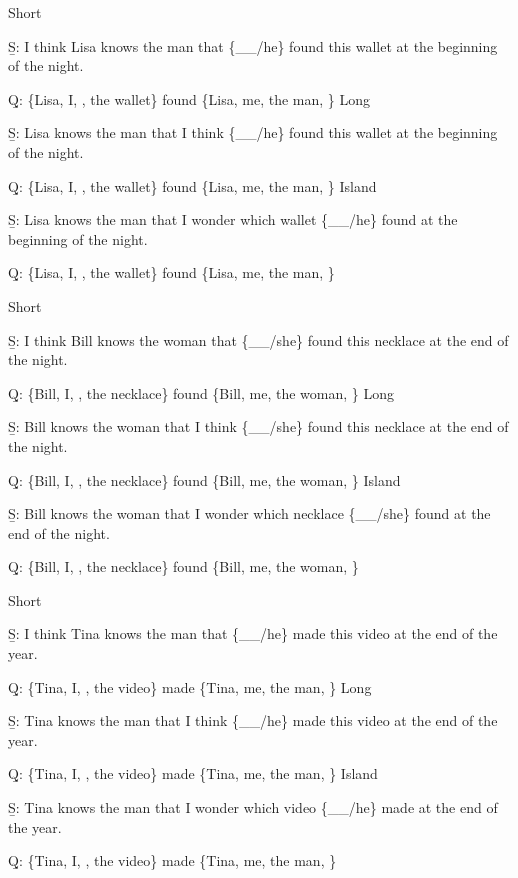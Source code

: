 \pex 
\a Short\par\nobreak
\beginsubsub 
\b{S:} I think Lisa knows the man that \{\_\_/he\} found this wallet at the beginning of the night.\par\nobreak
\b{Q:} \{Lisa, I, , the wallet\} found \{Lisa, me, the man, \}
\endsubsub
\a Long\par\nobreak
\beginsubsub
\b{S:} Lisa knows the man that I think \{\_\_/he\} found this wallet at the beginning of the night.\par\nobreak
\b{Q:} \{Lisa, I, , the wallet\} found \{Lisa, me, the man, \}
\endsubsub
\a Island\par\nobreak
\beginsubsub
\b{S:} Lisa knows the man that I wonder which wallet \{\_\_/he\} found at the beginning of the night.\par\nobreak
\b{Q:} \{Lisa, I, , the wallet\} found \{Lisa, me, the man, \}
\endsubsub
\xe

\pex 
\a Short\par\nobreak
\beginsubsub 
\b{S:} I think Bill knows the woman that \{\_\_/she\} found this necklace at the end of the night.\par\nobreak
\b{Q:} \{Bill, I, , the necklace\} found \{Bill, me, the woman, \}
\endsubsub
\a Long\par\nobreak
\beginsubsub
\b{S:} Bill knows the woman that I think \{\_\_/she\} found this necklace at the end of the night.\par\nobreak
\b{Q:} \{Bill, I, , the necklace\} found \{Bill, me, the woman, \}
\endsubsub
\a Island\par\nobreak
\beginsubsub
\b{S:} Bill knows the woman that I wonder which necklace \{\_\_/she\} found at the end of the night.\par\nobreak
\b{Q:} \{Bill, I, , the necklace\} found \{Bill, me, the woman, \}
\endsubsub
\xe

\pex 
\a Short\par\nobreak
\beginsubsub 
\b{S:} I think Tina knows the man that \{\_\_/he\} made this video at the end of the year.\par\nobreak
\b{Q:} \{Tina, I, , the video\} made \{Tina, me, the man, \}
\endsubsub
\a Long\par\nobreak
\beginsubsub
\b{S:} Tina knows the man that I think \{\_\_/he\} made this video at the end of the year.\par\nobreak
\b{Q:} \{Tina, I, , the video\} made \{Tina, me, the man, \}
\endsubsub
\a Island\par\nobreak
\beginsubsub
\b{S:} Tina knows the man that I wonder which video \{\_\_/he\} made at the end of the year.\par\nobreak
\b{Q:} \{Tina, I, , the video\} made \{Tina, me, the man, \}
\endsubsub
\xe

